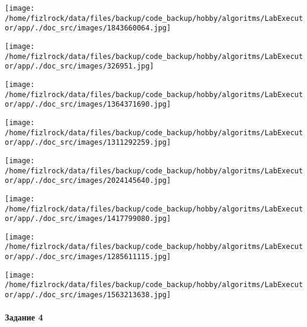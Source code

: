 \documentclass[a4paper, 12pt]{article}
\begin{document}
\texttt{[image: /home/fizlrock/data/files/backup/code\_backup/hobby/algoritms/LabExecutor/app/./doc\_src/images/1843660064.jpg]}

\texttt{[image: /home/fizlrock/data/files/backup/code\_backup/hobby/algoritms/LabExecutor/app/./doc\_src/images/326951.jpg]}

\texttt{[image: /home/fizlrock/data/files/backup/code\_backup/hobby/algoritms/LabExecutor/app/./doc\_src/images/1364371690.jpg]}

\texttt{[image: /home/fizlrock/data/files/backup/code\_backup/hobby/algoritms/LabExecutor/app/./doc\_src/images/1311292259.jpg]}

\texttt{[image: /home/fizlrock/data/files/backup/code\_backup/hobby/algoritms/LabExecutor/app/./doc\_src/images/2024145640.jpg]}

\texttt{[image: /home/fizlrock/data/files/backup/code\_backup/hobby/algoritms/LabExecutor/app/./doc\_src/images/1417799080.jpg]}

\texttt{[image: /home/fizlrock/data/files/backup/code\_backup/hobby/algoritms/LabExecutor/app/./doc\_src/images/1285611115.jpg]}

\texttt{[image: /home/fizlrock/data/files/backup/code\_backup/hobby/algoritms/LabExecutor/app/./doc\_src/images/1563213638.jpg]}
\pagebreak
\paragraph{Задание 4}
\end{document}
